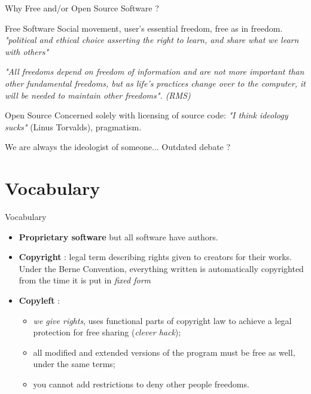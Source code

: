 \documentclass{beamer}
\begin{document}
\begin{frame}{Why Free and/or Open Source Software ?}

  \begin{block}{Free Software}
    Social movement, user's essential freedom, free as in
    freedom. \textit{"political and ethical choice asserting the right
      to learn, and share what we learn with others"}
  \end{block}

  \textit{"All freedoms depend on freedom of information and are not
    more important than other fundamental freedoms, but as life's
    practices change over to the computer, it will be needed to
    maintain other freedoms". (RMS)}

  \pause

  \begin{block}{Open Source}
    Concerned solely with licensing of source code: \textit{"I think
      ideology sucks"} (Linus Torvalds), pragmatism.
  \end{block}

  We are always the ideologist of someone... Outdated debate ?
\end{frame}

\section{Vocabulary}


\begin{frame}{Vocabulary}
  \begin{itemize}
  \item \textbf{Proprietary software} but all software have authors.
  \item \textbf{Copyright} : legal term describing rights given to
    creators for their works. Under the Berne Convention, everything
    written is automatically copyrighted from the time it is put in
    \emph{fixed form}
  \item \textbf{Copyleft} :
    \begin{itemize}
    \item \textit{we give rights}, uses functional parts of copyright
      law to achieve a legal protection for free sharing (\emph{clever
        hack});
    \item all modified and extended versions of the program must be
      free as well, under the same terms;
    \item you cannot add restrictions to deny other people freedoms.
    \end{itemize}

  \end{itemize}
\end{frame}
\end{document}

